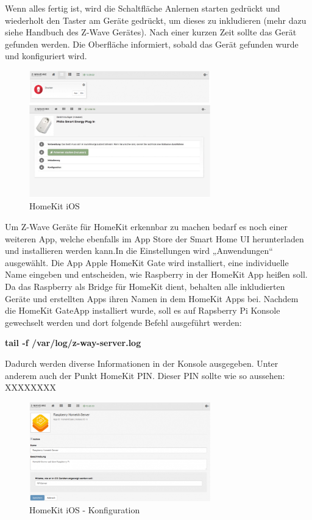 Wenn alles fertig ist, wird die Schaltfläche \glqq Anlernen starten\grqq{} gedrückt und wiederholt den Taster am Geräte gedrückt, um dieses zu inkludieren (mehr dazu siehe Handbuch des Z-Wave Gerätes). Nach einer kurzen Zeit sollte das Gerät gefunden werden. Die Oberfläche informiert, sobald das Gerät gefunden wurde und konfiguriert wird.

\begin{figure}[h!]
	\centering
	\includegraphics[width=0.7\textwidth]{img/Feedback-Mechanismen/HomeKit.png}
	\caption{HomeKit iOS}
	\label{fig:feedbackHomeKit}
\end{figure}

Um Z-Wave Geräte für HomeKit erkennbar zu machen bedarf es noch einer weiteren App, welche ebenfalls im App Store der Smart Home UI herunterladen und installieren werden kann.In die Einstellungen wird „Anwendungen“ ausgewählt. Die \glqq App Apple HomeKit Gate\grqq{} wird installiert, eine individuelle Name eingeben und entscheiden, wie Raspberry in der HomeKit App heißen soll. Da das Raspberry als Bridge für HomeKit dient, behalten alle inkludierten Geräte und erstellten Apps ihren Namen in dem HomeKit Apps bei. Nachdem die \glqq HomeKit Gate\grqq App installiert wurde, soll es auf Rapsberry Pi Konsole gewechselt werden und dort folgende Befehl ausgeführt werden:

\textbf{tail -f /var/log/z-way-server.log}

Dadurch werden diverse Informationen in der Konsole ausgegeben. Unter anderem auch der Punkt \glqq HomeKit PIN\grqq. Dieser PIN sollte wie so aussehen: XXXXXXXX

\begin{figure}[h!]
	\centering
	\includegraphics[width=0.7\textwidth]{img/Feedback-Mechanismen/HomeKitKonfiguration.png}
	\caption{HomeKit iOS - Konfiguration}
	\label{fig:feedbackHomeKitKonfiguration}
\end{figure}

